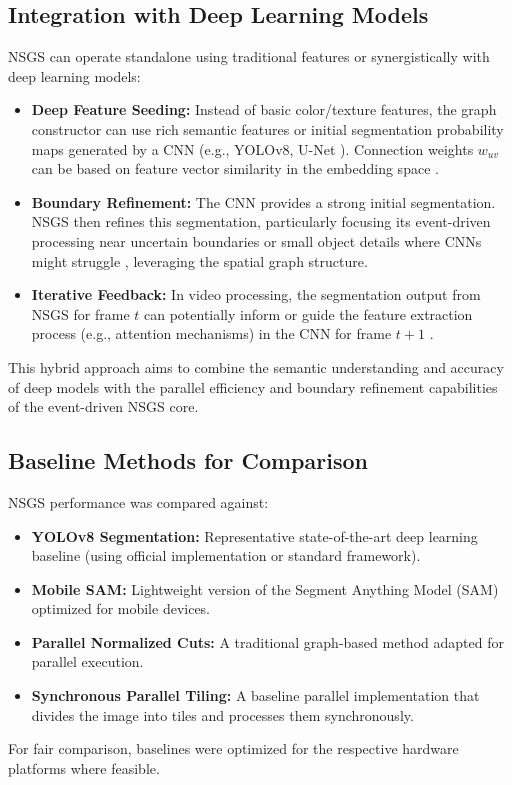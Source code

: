 \documentclass[conference]{IEEEtran}
\begin{document}
\subsection{Integration with Deep Learning Models} \label{subsec:dl_integration}

NSGS can operate standalone using traditional features or synergistically with deep learning models:
\begin{itemize}
    \item \textbf{Deep Feature Seeding:} Instead of basic color/texture features, the graph constructor can use rich semantic features or initial segmentation probability maps generated by a CNN (e.g., YOLOv8, U-Net \cite{Ronneberger2015}). Connection weights \(w_{uv}\) can be based on feature vector similarity in the embedding space \cite{Hinton2006}.
    \item \textbf{Boundary Refinement:} The CNN provides a strong initial segmentation. NSGS then refines this segmentation, particularly focusing its event-driven processing near uncertain boundaries or small object details where CNNs might struggle \cite{Wang2020, Lin2022}, leveraging the spatial graph structure.
    \item \textbf{Iterative Feedback:} In video processing, the segmentation output from NSGS for frame \(t\) can potentially inform or guide the feature extraction process (e.g., attention mechanisms) in the CNN for frame \(t+1\) \cite{Chen2021, Sun2019}.
\end{itemize}
This hybrid approach aims to combine the semantic understanding and accuracy of deep models with the parallel efficiency and boundary refinement capabilities of the event-driven NSGS core.

\subsection{Baseline Methods for Comparison}

NSGS performance was compared against:
\begin{itemize}
    \item \textbf{YOLOv8 Segmentation:} Representative state-of-the-art deep learning baseline (using official implementation or standard framework).
    \item \textbf{Mobile SAM:} Lightweight version of the Segment Anything Model (SAM) optimized for mobile devices.
    \item \textbf{Parallel Normalized Cuts:} A traditional graph-based method adapted for parallel execution. %
    \item \textbf{Synchronous Parallel Tiling:} A baseline parallel implementation that divides the image into tiles and processes them synchronously.
\end{itemize}
For fair comparison, baselines were optimized for the respective hardware platforms where feasible.
\end{document}
